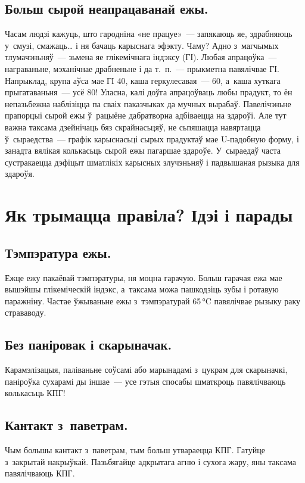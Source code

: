 \subsection{Больш сырой неапрацаванай ежы.}
Часам людзі кажуць, што гародніна «не працуе»~--- запякаюць яе, здрабняюць у~смузі, смажаць… і ня бачаць карыснага эфэкту. Чаму? Адно з~магчымых тлумачэньняў~--- зьмена яе глікемічнага індэксу (ГІ). Любая апрацоўка~--- награваньне, мэханічнае драбненьне і да т.~п.~--- прыкметна павялічвае ГІ. Напрыклад, крупа аўса мае ГІ 40, каша геркулесавая~--- 60, а~каша хуткага прыгатаваньня~--- усё 80! Уласна, калі доўга апрацоўваць любы прадукт, то ён непазьбежна наблізіцца па сваіх паказчыках да мучных вырабаў. Павелічэньне прапорцыі сырой ежы ў~рацыёне дабратворна адбіваецца на здароўі. Але тут важна таксама дзейнічаць бяз скрайнасьцяў, не сьпяшацца навяртацца ў~сыраедства~--- графік карыснасьці сырых прадуктаў мае U-падобную форму, і занадта вялікая колькасьць сырой ежы пагаршае здароўе. У~сыраедаў часта сустракаецца дэфіцыт шматлікіх карысных злучэньняў і падвышаная рызыка для здароўя.

\section{Як трымацца правіла? Ідэі і парады}

\subsection{Тэмпэратура ежы.}
Ежце ежу пакаёвай тэмпэратуры, ня моцна гарачую. Больш гарачая ежа мае вышэйшы глікеміческій індэкс, а~таксама можа пашкодзіць зубы і ротавую паражніну. Частае ўжываньне ежы з~тэмпэратурай 65\,°C павялічвае рызыку раку страваводу.

\subsection{Без паніровак і скарыначак.}
Карамэлізацыя, паліваньне соўсамі або марынадамі з~цукрам для скарыначкі, паніроўка сухарамі ды іншае~--- усе гэтыя спосабы шматкроць павялічваюць колькасьць КПГ!

\subsection{Кантакт з~паветрам.}
Чым большы кантакт з~паветрам, тым больш утвараецца КПГ. Гатуйце з~закрытай накрыўкай. Пазьбягайце адкрытага агню і сухога жару, яны таксама павялічваюць КПГ.

